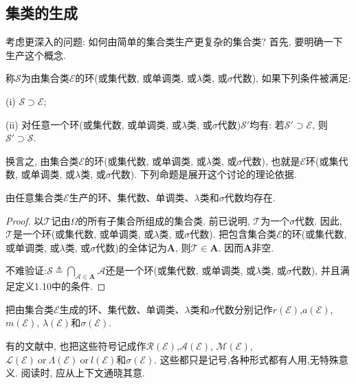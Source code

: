 \subsection{集类的生成}
考虑更深入的问题: 如何由简单的集合类生产更复杂的集合类? 首先, 要明确一下生产这个概念.
\begin{definition}[集类的生成]
	称$\mathscr{S}$为由集合类$\mathscr{E}$的环(或集代数, 或单调类, 或$\lambda$类, 或$\sigma$代数), 如果下列条件被满足:
	\begin{blist}
		\item[(i)] $\mathscr{S}\supset \mathscr{E}$;
		\item[(ii)] 对任意一个环(或集代数, 或单调类, 或$\lambda$类, 或$\sigma$代数)$\mathscr{S}'$均有: 若$\mathscr{S}'\supset \mathscr{E}$, 则$\mathscr{S}'\supset \mathscr{S}$.
	\end{blist}
\end{definition}

换言之, 由集合类$\mathscr{E}$的环(或集代数, 或单调类, 或$\lambda$类, 或$\sigma$代数), 也就是$\mathscr{E}$环(或集代数, 或单调类, 或$\lambda$类, 或$\sigma$代数). 下列命题是展开这个讨论的理论依据.
\begin{lemma}
	由任意集合类$\mathscr{E}$生产的环、集代数、单调类、$\lambda$类和$\sigma$代数均存在.
\end{lemma}
\begin{proof}
	以$\mathscr{T}$记由$\Omega$的所有子集合所组成的集合类. 前已说明, $\mathscr{T}$为一个$\sigma$代数. 因此, $\mathscr{T}$是一个环(或集代数, 或单调类, 或$\lambda$类, 或$\sigma$代数). 把包含集合类$\mathscr{E}$的环(或集代数, 或单调类, 或$\lambda$类, 或$\sigma$代数)的全体记为$\bm{A}$, 则$\mathscr{T}\in\bm{A}$. 因而$\bm{A}$非空.
	
	不难验证:$\mathscr{S}\triangleq \bigcap\limits_{\mathscr{A}\in\bm{A}}\mathscr{A}$还是一个环(或集代数, 或单调类, 或$\lambda$类, 或$\sigma$代数), 并且满足定义1.10中的条件.
\end{proof}

把由集合类$\mathscr{E}$生成的环、集代数、单调类、$\lambda$类和$\sigma$代数分别记作$r(\mathscr{E})$,$a(\mathscr{E})$, $m(\mathscr{E})$, $\lambda(\mathscr{E})$和$\sigma(\mathscr{E})$.
\begin{note}
	有的文献中, 也把这些符号记成作$\mathscr{R}(\mathscr{E})$,$\mathscr{A}(\mathscr{E})$, $\mathscr{M}(\mathscr{E})$, $\mathscr{L}(\mathscr{E})~\text{or} ~\Lambda(\mathscr{E})~\text{or} ~l(\mathscr{E})$和$\sigma(\mathscr{E})$. 
	这些都只是记号,各种形式都有人用,无特殊意义. 阅读时, 应从上下文通晓其意.
\end{note}

